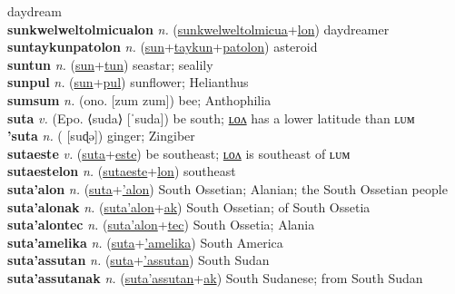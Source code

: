 daydream \label{sunkwelweltolmicualum} \\
\textbf{sunkwelweltolmicualon} \textit{n.} (\hyperref[sunkwelweltolmicua]{sunkwelweltolmicua}+\hyperref[lon]{lon})
daydreamer \label{sunkwelweltolmicualon} \\
\textbf{suntaykunpatolon} \textit{n.} (\hyperref[sun]{sun}+\hyperref[taykun]{taykun}+\hyperref[patolon]{patolon})
asteroid \label{suntaykunpatolon} \\
\textbf{suntun} \textit{n.} (\hyperref[sun]{sun}+\hyperref[tun]{tun})
seastar; sealily \label{suntun} \\
\textbf{sunpul} \textit{n.} (\hyperref[sun]{sun}+\hyperref[pul]{pul})
sunflower; Helianthus \label{sunpul} \\
\textbf{sumsum} \textit{n.} (ono. [zum zum])
bee; Anthophilia \label{sumsum} \\
\textbf{suta} \textit{v.} (Epo. ⟨suda⟩ [ˈsuda])
be south; \hyperref[sutalon]{ʟᴏᴧ} has a lower latitude than ʟᴜᴍ \label{suta} \\
\textbf{'suta} \textit{n.} ( [suɖə])
ginger; Zingiber \label{'suta} \\
\textbf{sutaeste} \textit{v.} (\hyperref[suta]{suta}+\hyperref[este]{este})
be southeast; \hyperref[sutaestelon]{ʟᴏᴧ} is southeast of ʟᴜᴍ \label{sutaeste} \\
\textbf{sutaestelon} \textit{n.} (\hyperref[sutaeste]{sutaeste}+\hyperref[lon]{lon})
southeast \label{sutaestelon} \\
\textbf{suta'alon} \textit{n.} (\hyperref[suta]{suta}+\hyperref['alon]{'alon})
South Ossetian; Alanian; the South Ossetian people \label{suta'alon} \\
\textbf{suta'alonak} \textit{n.} (\hyperref[suta'alon]{suta'alon}+\hyperref[ak]{ak})
South Ossetian; of South Ossetia \label{suta'alonak} \\
\textbf{suta'alontec} \textit{n.} (\hyperref[suta'alon]{suta'alon}+\hyperref[tec]{tec})
South Ossetia; Alania \label{suta'alontec} \\
\textbf{suta'amelika} \textit{n.} (\hyperref[suta]{suta}+\hyperref['amelika]{'amelika})
South America \label{suta'amelika} \\
\textbf{suta'assutan} \textit{n.} (\hyperref[suta]{suta}+\hyperref['assutan]{'assutan})
South Sudan \label{suta'assutan} \\
\textbf{suta'assutanak} \textit{n.} (\hyperref[suta'assutan]{suta'assutan}+\hyperref[ak]{ak})
South Sudanese; from South Sudan \label{suta'assutanak} \\
